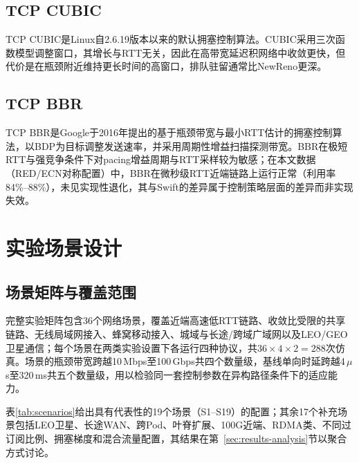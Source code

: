 \subsection{TCP CUBIC}

TCP CUBIC是Linux自2.6.19版本以来的默认拥塞控制算法。CUBIC采用三次函数模型调整窗口，其增长与RTT无关，因此在高带宽延迟积网络中收敛更快，但代价是在瓶颈附近维持更长时间的高窗口，排队驻留通常比NewReno更深。

\subsection{TCP BBR}

TCP BBR是Google于2016年提出的基于瓶颈带宽与最小RTT估计的拥塞控制算法，以BDP为目标调整发送速率，并采用周期性增益扫描探测带宽。BBR在极短RTT与强竞争条件下对pacing增益周期与RTT采样较为敏感；在本文数据（RED/ECN对称配置）中，BBR在微秒级RTT近端链路上运行正常（利用率84\%--88\%），未见实现性退化，其与Swift的差异属于控制策略层面的差异而非实现失效。

\section{实验场景设计}

\subsection{场景矩阵与覆盖范围}

完整实验矩阵包含36个网络场景，覆盖近端高速低RTT链路、收敛比受限的共享链路、无线局域网接入、蜂窝移动接入、城域与长途/跨域广域网以及LEO/GEO卫星通信；每个场景在两类实验设置下各运行四种协议，共$36 \times 4 \times 2 = 288$次仿真。场景的瓶颈带宽跨越10\,Mbps至100\,Gbps共四个数量级，基线单向时延跨越4\,$\mu$s至320\,ms共五个数量级，用以检验同一套控制参数在异构路径条件下的适应能力。

表\ref{tab:scenarios}给出具有代表性的19个场景（S1--S19）的配置；其余17个补充场景包括LEO卫星、长途WAN、跨Pod、叶脊扩展、100G近端、RDMA类、不同过订阅比例、拥塞梯度和混合流量配置，其结果在第~\ref{sec:results-analysis}节以聚合方式讨论。

